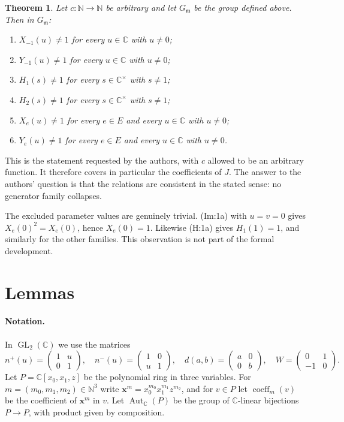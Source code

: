 \documentclass[11pt]{article}
\newtheorem{theorem}{Theorem}[section]
\theoremstyle{definition}
\theoremstyle{remark}
\newcommand{\CC}{\mathbb{C}}
\newcommand{\NN}{\mathbb{N}}
\DeclareMathOperator{\GL}{GL}
\DeclareMathOperator{\Aut}{Aut}
\DeclareMathOperator{\coeff}{coeff}
\begin{document}
\begin{theorem}\label{thm:main}
Let $c\colon\NN\to\NN$ be arbitrary and let $G_{\mathfrak m}$ be the group defined above. Then in $G_{\mathfrak m}$:
\begin{enumerate}
\item $X_{-1}(u)\neq1$ for every $u\in\CC$ with $u\neq0$;
\item $Y_{-1}(u)\neq1$ for every $u\in\CC$ with $u\neq0$;
\item $H_1(s)\neq1$ for every $s\in\CC^\times$ with $s\ne1$;
\item $H_2(s)\neq1$ for every $s\in\CC^\times$ with $s\neq1$;
\item $X_e(u)\ne1$ for every $e\in E$ and every $u\in\CC$ with $u\neq0$;
\item $Y_e(u)\neq 1$ for every $e\in E$ and every $u\in\CC$ with $u\ne0$.
\end{enumerate}
\end{theorem}

This is the statement requested by the authors, with $c$ allowed to be an arbitrary function. It therefore covers in particular the coefficients of $J$. The answer to the authors' question is that the relations are consistent in the stated sense: no generator family collapses.

The excluded parameter values are genuinely trivial. (Im:1a) with $u=v=0$ gives $X_e(0)^2=X_e(0)$, hence $X_e(0)=1$. Likewise (H:1a) gives $H_1(1)=1$, and similarly for the other families. This observation is not part of the formal development.

\section{Lemmas}

\paragraph{Notation.} In $\GL_2(\CC)$ we use the matrices
\[
n^+(u)=\begin{pmatrix}1&u\\0&1\end{pmatrix},\quad n^-(u)=\begin{pmatrix}1&0\\u&1\end{pmatrix},\quad d(a,b)=\begin{pmatrix}a&0\\0&b\end{pmatrix},\quad W=\begin{pmatrix}0&1\\-1&0\end{pmatrix}.
\]
Let $P=\CC[x_0,x_1,z]$ be the polynomial ring in three variables. For $m=(m_0,m_1,m_2)\in\NN^3$ write $\mathbf x^m=x_0^{m_0}x_1^{m_1}z^{m_2}$, and for $v\in P$ let $\coeff_m(v)$ be the coefficient of $\mathbf x^m$ in $v$. Let $\Aut_\CC(P)$ be the group of $\CC$-linear bijections $P\to P$, with product given by composition.
\end{document}
